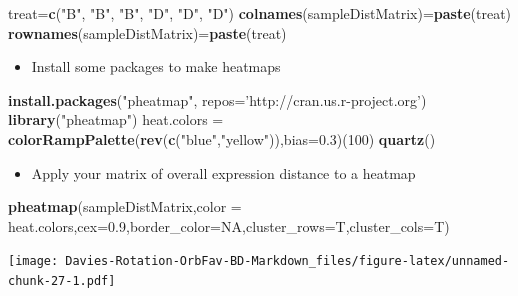 \documentclass[
]{article}
\newenvironment{Shaded}{\begin{snugshade}}{\end{snugshade}}
\newcommand{\DataTypeTok}[1]{\textcolor[rgb]{0.13,0.29,0.53}{#1}}
\newcommand{\DecValTok}[1]{\textcolor[rgb]{0.00,0.00,0.81}{#1}}
\newcommand{\FloatTok}[1]{\textcolor[rgb]{0.00,0.00,0.81}{#1}}
\newcommand{\KeywordTok}[1]{\textcolor[rgb]{0.13,0.29,0.53}{\textbf{#1}}}
\newcommand{\NormalTok}[1]{#1}
\newcommand{\OtherTok}[1]{\textcolor[rgb]{0.56,0.35,0.01}{#1}}
\newcommand{\StringTok}[1]{\textcolor[rgb]{0.31,0.60,0.02}{#1}}
\providecommand{\tightlist}{%
  \setlength{\itemsep}{0pt}\setlength{\parskip}{0pt}}
\begin{document}
\begin{Shaded}
\begin{Highlighting}[]
\NormalTok{treat=}\KeywordTok{c}\NormalTok{(}\StringTok{"B"}\NormalTok{, }\StringTok{"B"}\NormalTok{, }\StringTok{"B"}\NormalTok{, }\StringTok{"D"}\NormalTok{, }\StringTok{"D"}\NormalTok{, }\StringTok{"D"}\NormalTok{)}
\KeywordTok{colnames}\NormalTok{(sampleDistMatrix)=}\KeywordTok{paste}\NormalTok{(treat)}
\KeywordTok{rownames}\NormalTok{(sampleDistMatrix)=}\KeywordTok{paste}\NormalTok{(treat)}
\end{Highlighting}
\end{Shaded}

\begin{itemize}
\tightlist
\item
  Install some packages to make heatmaps
\end{itemize}

\begin{Shaded}
\begin{Highlighting}[]
\KeywordTok{install.packages}\NormalTok{(}\StringTok{"pheatmap"}\NormalTok{, }\DataTypeTok{repos=}\StringTok{'http://cran.us.r-project.org'}\NormalTok{)}
\KeywordTok{library}\NormalTok{(}\StringTok{"pheatmap"}\NormalTok{)}
\NormalTok{heat.colors =}\StringTok{ }\KeywordTok{colorRampPalette}\NormalTok{(}\KeywordTok{rev}\NormalTok{(}\KeywordTok{c}\NormalTok{(}\StringTok{"blue"}\NormalTok{,}\StringTok{"yellow"}\NormalTok{)),}\DataTypeTok{bias=}\FloatTok{0.3}\NormalTok{)(}\DecValTok{100}\NormalTok{)}
\KeywordTok{quartz}\NormalTok{()}
\end{Highlighting}
\end{Shaded}

\begin{itemize}
\tightlist
\item
  Apply your matrix of overall expression distance to a heatmap
\end{itemize}

\begin{Shaded}
\begin{Highlighting}[]
\KeywordTok{pheatmap}\NormalTok{(sampleDistMatrix,}\DataTypeTok{color =}\NormalTok{ heat.colors,}\DataTypeTok{cex=}\FloatTok{0.9}\NormalTok{,}\DataTypeTok{border_color=}\OtherTok{NA}\NormalTok{,}\DataTypeTok{cluster_rows=}\NormalTok{T,}\DataTypeTok{cluster_cols=}\NormalTok{T)}
\end{Highlighting}
\end{Shaded}

\texttt{[image: Davies-Rotation-OrbFav-BD-Markdown\_files/figure-latex/unnamed-chunk-27-1.pdf]}
\end{document}
